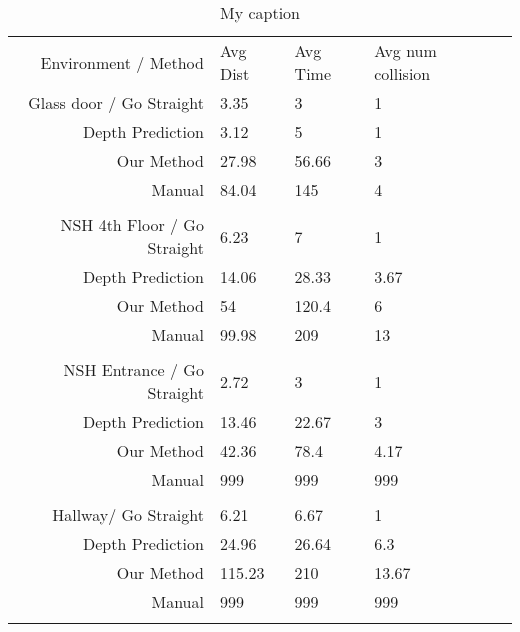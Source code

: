 \documentclass{article}
\begin{document}
\begin{table}[]
\centering
\caption{My caption}
\label{my-label}
\begin{tabular}{rllll}
Environment / Method             & Avg Dist & Avg Time & Avg num collision &  \\
Glass door / Go Straight         & 3.35     & 3        & 1                 &  \\
Depth Prediction                 & 3.12     & 5        & 1                 &  \\
Our Method                       & 27.98    & 56.66    & 3                 &  \\
Manual                           & 84.04    & 145      & 4                 &  \\
\multicolumn{1}{l}{}             &          &          &                   &  \\
NSH 4th Floor / Go Straight      & 6.23     & 7        & 1                 &  \\
Depth Prediction                 & 14.06    & 28.33    & 3.67              &  \\
Our Method                       & 54       & 120.4    & 6                 &  \\
Manual                           & 99.98    & 209      & 13                &  \\
\multicolumn{1}{l}{}             &          &          &                   &  \\
NSH Entrance / Go Straight       & 2.72     & 3        & 1                 &  \\
Depth Prediction                 & 13.46    & 22.67    & 3                 &  \\
Our Method                       & 42.36    & 78.4     & 4.17              &  \\
Manual                           & 999      & 999      & 999               &  \\
\multicolumn{1}{l}{}             &          &          &                   &  \\
Hallway/ Go Straight             & 6.21     & 6.67     & 1                 &  \\
Depth Prediction                 & 24.96    & 26.64    & 6.3               &  \\
Our Method                       & 115.23   & 210      & 13.67             &  \\
Manual                           & 999      & 999      & 999               &  \\
\multicolumn{1}{l}{}             &          &          &                   &  \\

\end{tabular}
\end{table}
\end{document}

